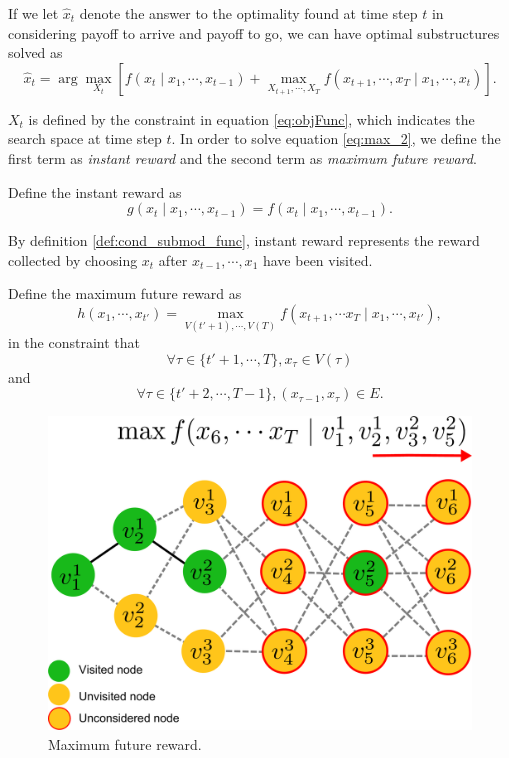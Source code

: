\documentclass[12pt]{article}
\begin{document}
If we let $ \hat{x}_{t} $ denote the answer to the optimality found at time step $ t $ in considering payoff to arrive and payoff to go,  we can have optimal substructures solved as 
\begin{equation}
\label{eq:max_2}
\hat{x}_{t} = \arg \max_{X_{t}} \left[ f(x_{t} \mid x_{1} , \cdots , x_{t-1})
+ \max_{X_{t+1}, \cdots , X_{T}} f(x_{t+1}, \cdots , x_{T} \mid x_{1}, \cdots , x_{t})
\right].
\end{equation}

$ X_{t} $ is defined by the constraint in equation \eqref{eq:objFunc}, which indicates the search space at time step $ t $.
In order to solve equation \eqref{eq:max_2}, we define the first term as \emph{instant reward} and the second term as \emph{maximum future reward}.

\begin{mydef}
\label{def:instant_reward}
Define the instant reward as 
\begin{equation}
\label{eq:def_g}
g(x_{t} \mid x_{1} , \cdots , x_{t-1} ) = f(x_{t} \mid x_{1} , \cdots , x_{t-1}). 
\end{equation}
\end{mydef}

By definition \ref{def:cond_submod_func}, instant reward represents the reward collected by choosing $ x_{t} $ after $ x_{t-1} , \cdots , x_{1} $ have been visited.

\begin{mydef}
\label{def:max_future_reward}
Define the maximum future reward as
\begin{equation}
\label{eq:def_h}
h(x_{1} , \cdots, x_{t'} ) = \max_{V(t'+1), \cdots , V(T)} f(x_{t+1}, \cdots x_{T} \mid x_{1}, \cdots , x_{t'}),
\end{equation} 
in the constraint that
\begin{equation}
\label{eq:def_h:constraint1}
\forall \tau \in \{ t'+1 , \cdots , T \},  x_{\tau} \in V(\tau)
\end{equation}
and
\begin{equation}
\label{eq:def_h:constraint2}
\forall \tau \in \{ t'+2, \cdots ,T-1 \}, ( x_{\tau-1}, x_{\tau} ) \in E .
\end{equation}
\end{mydef}

\begin{figure}
\centering
\includegraphics[width=0.5\linewidth]{./images/DefineFuncH.pdf}
\caption{Maximum future reward.}
\label{fig:DefineFuncH}
\end{figure}
\end{document}

